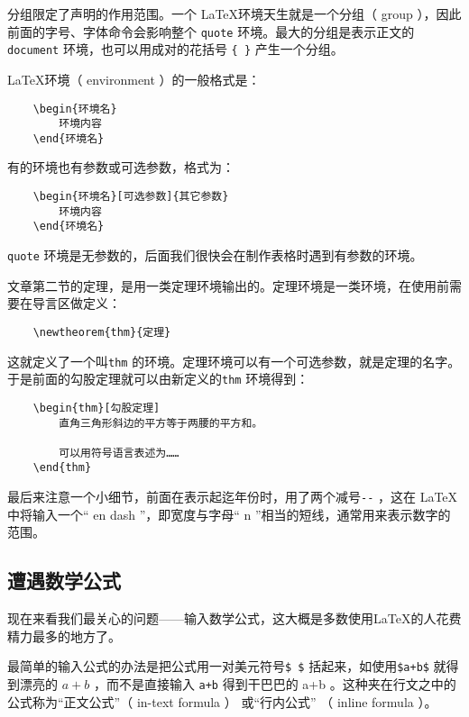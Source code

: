 分组限定了声明的作用范围。一个 \LaTeX 环境天生就是一个分组（ group ），因此前面的字号、字体命令会影响整个 \verb|quote| 环境。最大的分组是表示正文的 \verb|document| 环境，也可以用成对的花括号 \verb|{ }| 产生一个分组。

\LaTeX 环境（ environment ）的一般格式是：
\begin{lstlisting}
    \begin{环境名}
        环境内容
    \end{环境名}
\end{lstlisting}

有的环境也有参数或可选参数，格式为：
\begin{lstlisting}
    \begin{环境名}[可选参数]{其它参数}
        环境内容
    \end{环境名}
\end{lstlisting}

\verb|quote| 环境是无参数的，后面我们很快会在制作表格时遇到有参数的环境。

文章第二节的定理，是用一类定理环境输出的。定理环境是一类环境，在使用前需要在导言区做定义：
\begin{lstlisting}
    \newtheorem{thm}{定理}
\end{lstlisting}
这就定义了一个叫\verb|thm| 的环境。定理环境可以有一个可选参数，就是定理的名字。于是前面的勾股定理就可以由新定义的\verb|thm| 环境得到：
\begin{lstlisting}
    \begin{thm}[勾股定理]
        直角三角形斜边的平方等于两腰的平方和。
    
        可以用符号语言表述为……
    \end{thm}
\end{lstlisting}

最后来注意一个小细节，前面在表示起迄年份时，用了两个减号\verb|--| ，这在 \LaTeX 中将输入一个“ en dash ”，即宽度与字母“ n ”相当的短线，通常用来表示数字的范围。

\subsection{遭遇数学公式}

现在来看我们最关心的问题——输入数学公式，这大概是多数使用\LaTeX 的人花费精力最多的地方了。

最简单的输入公式的办法是把公式用一对美元符号\verb|$ $| 括起来，如使用\verb|$a+b$| 就得到漂亮的 $a+b$ ，而不是直接输入 \verb|a+b| 得到干巴巴的 a+b 。这种夹在行文之中的公式称为“正文公式”（ in-text formula ） 或“行内公式” （ inline formula ）。

